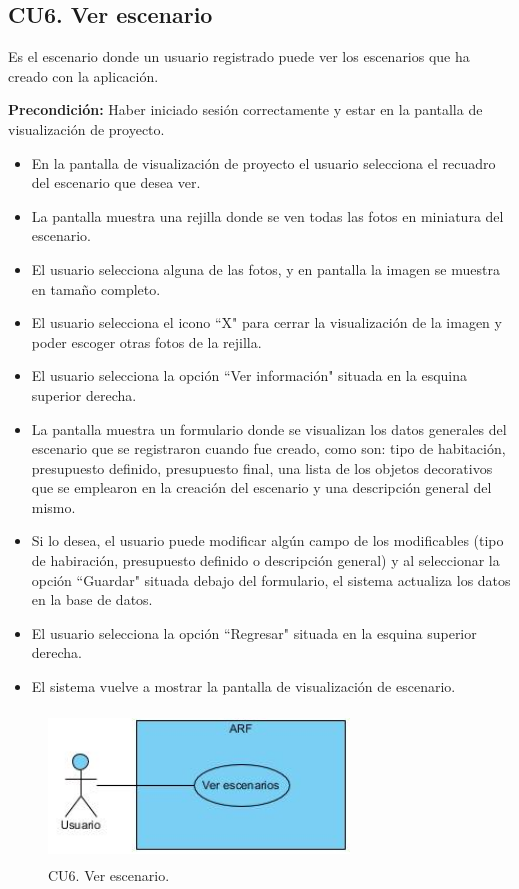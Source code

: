 \subsection{CU6. Ver escenario}\par
Es el escenario donde un usuario registrado puede ver los escenarios que ha creado con la aplicación.\par
\textbf{Precondición:} Haber iniciado sesión correctamente y estar en la pantalla de visualización de proyecto.\par
\begin{itemize}
	\item En la pantalla de visualización de proyecto el usuario selecciona el recuadro del escenario que desea ver.
	\item La pantalla muestra una rejilla donde se ven todas las fotos en miniatura del escenario.
	\item El usuario selecciona alguna de las fotos, y en pantalla la imagen se muestra en tamaño completo.
	\item El usuario selecciona el icono ``X" para cerrar la visualización de la imagen y poder escoger otras fotos de la rejilla.
	\item El usuario selecciona la opción ``Ver información" situada en la esquina superior derecha.
	\item La pantalla muestra un formulario donde se visualizan los datos generales del escenario que se registraron cuando fue creado, como son: tipo de habitación, presupuesto definido, presupuesto final, una lista de los objetos decorativos que se emplearon en la creación del escenario y una descripción general del mismo.
	\item Si lo desea, el usuario puede modificar algún campo de los modificables (tipo de habiración, presupuesto definido o descripción general) y al seleccionar la opción ``Guardar" situada debajo del formulario, el sistema actualiza los datos en la base de datos.
	\item El usuario selecciona la opción ``Regresar" situada en la esquina superior derecha.
	\item El sistema vuelve a mostrar la pantalla de visualización de escenario.
\end{itemize}

\begin{figure}[h!]
	\centering
	\includegraphics[width=8cm,height=4cm]{imagenes/analisis/cu/ver_escenarios.jpg}
	\caption{CU6. Ver escenario.}
	\label{fig:verescenario}
\end{figure} 

